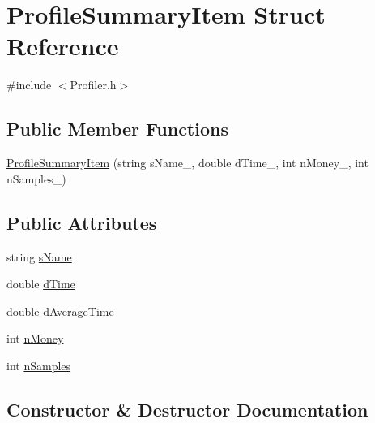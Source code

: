 \hypertarget{struct_profile_summary_item}{}\section{Profile\+Summary\+Item Struct Reference}
\label{struct_profile_summary_item}


{\ttfamily \#include $<$Profiler.\+h$>$}

\subsection*{Public Member Functions}
\begin{DoxyCompactItemize}
\item 
\hyperlink{struct_profile_summary_item_a67f0869459544c2ec935a33bbd8e3b29}{Profile\+Summary\+Item} (string s\+Name\+\_\+, double d\+Time\+\_\+, int n\+Money\+\_\+, int n\+Samples\+\_\+)
\end{DoxyCompactItemize}
\subsection*{Public Attributes}
\begin{DoxyCompactItemize}
\item 
string \hyperlink{struct_profile_summary_item_ae37c58451ea8907b3b6580066bf48a71}{s\+Name}
\item 
double \hyperlink{struct_profile_summary_item_a0b2da66b3214112dd90e2837fa5fad6d}{d\+Time}
\item 
double \hyperlink{struct_profile_summary_item_abf81dcdf80bc064ca974259d2df1780f}{d\+Average\+Time}
\item 
int \hyperlink{struct_profile_summary_item_adf0a4305b7b6fa164400f9c88e3f925d}{n\+Money}
\item 
int \hyperlink{struct_profile_summary_item_adb8b4578844aaa85bd0bd7f970e23959}{n\+Samples}
\end{DoxyCompactItemize}


\subsection{Constructor \& Destructor Documentation}
\hypertarget{struct_profile_summary_item_a67f0869459544c2ec935a33bbd8e3b29}{}

